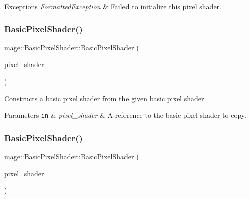 \begin{DoxyExceptions}{Exceptions}
{\em \hyperlink{structmage_1_1_formatted_exception}{Formatted\+Exception}} & Failed to initialize this pixel shader. \\
\hline
\end{DoxyExceptions}
\hypertarget{classmage_1_1_basic_pixel_shader_ab82055206ff2a05b73f18ce23353a4bb}{}\label{classmage_1_1_basic_pixel_shader_ab82055206ff2a05b73f18ce23353a4bb} 
\subsubsection{\texorpdfstring{Basic\+Pixel\+Shader()}{BasicPixelShader()}\hspace{0.1cm}{\footnotesize\ttfamily [3/4]}}
{\footnotesize\ttfamily mage\+::\+Basic\+Pixel\+Shader\+::\+Basic\+Pixel\+Shader (\begin{DoxyParamCaption}\item[{const \hyperlink{classmage_1_1_basic_pixel_shader}{Basic\+Pixel\+Shader} \&}]{pixel\+\_\+shader }\end{DoxyParamCaption})\hspace{0.3cm}{\ttfamily [delete]}}

Constructs a basic pixel shader from the given basic pixel shader.


\begin{DoxyParams}[1]{Parameters}
\mbox{\tt in}  & {\em pixel\+\_\+shader} & A reference to the basic pixel shader to copy. \\
\hline
\end{DoxyParams}
\hypertarget{classmage_1_1_basic_pixel_shader_a0a5366edb694e78e4c8075fad70b7dff}{}\label{classmage_1_1_basic_pixel_shader_a0a5366edb694e78e4c8075fad70b7dff} 
\subsubsection{\texorpdfstring{Basic\+Pixel\+Shader()}{BasicPixelShader()}\hspace{0.1cm}{\footnotesize\ttfamily [4/4]}}
{\footnotesize\ttfamily mage\+::\+Basic\+Pixel\+Shader\+::\+Basic\+Pixel\+Shader (\begin{DoxyParamCaption}\item[{\hyperlink{classmage_1_1_basic_pixel_shader}{Basic\+Pixel\+Shader} \&\&}]{pixel\+\_\+shader }\end{DoxyParamCaption})\hspace{0.3cm}{\ttfamily [default]}}

